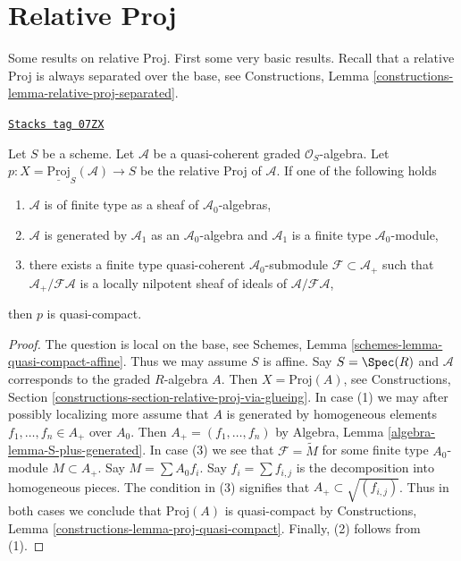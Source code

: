 \section{Relative Proj}
\label{divisors-section-relative-proj}
Some results on relative Proj.
First some very basic results. Recall that a relative Proj is always
separated over the base, see
Constructions, Lemma \ref{constructions-lemma-relative-proj-separated}.

\begin{lemma}
\label{divisors-lemma-relative-proj-quasi-compact}
\href{https://stacks.math.columbia.edu/tag/07ZX}{\texttt{Stacks tag 07ZX}}

Let $S$ be a scheme. Let $\mathcal{A}$ be a quasi-coherent graded
$\mathcal{O}_S$-algebra. Let
$p : X = \underline{\text{Proj}}_S(\mathcal{A}) \to S$ be the relative
Proj of $\mathcal{A}$. If one of the following holds
\begin{enumerate}
\item $\mathcal{A}$ is of finite type as a sheaf of
$\mathcal{A}_0$-algebras,
\item $\mathcal{A}$ is generated by $\mathcal{A}_1$ as an
$\mathcal{A}_0$-algebra and $\mathcal{A}_1$ is a finite type
$\mathcal{A}_0$-module,
\item there exists a finite type quasi-coherent $\mathcal{A}_0$-submodule
$\mathcal{F} \subset \mathcal{A}_{+}$ such that
$\mathcal{A}_{+}/\mathcal{F}\mathcal{A}$ is a locally nilpotent
sheaf of ideals of $\mathcal{A}/\mathcal{F}\mathcal{A}$,
\end{enumerate}
then $p$ is quasi-compact.
\end{lemma}

\begin{proof}
The question is local on the base, see
Schemes, Lemma \ref{schemes-lemma-quasi-compact-affine}.
Thus we may assume $S$ is affine.
Say $S = \Spec(R)$ and $\mathcal{A}$ corresponds to the
graded $R$-algebra $A$. Then $X = \text{Proj}(A)$, see
Constructions, Section \ref{constructions-section-relative-proj-via-glueing}.
In case (1) we may after possibly localizing more
assume that $A$ is generated by homogeneous elements
$f_1, \ldots, f_n \in A_{+}$ over $A_0$. Then
$A_{+} = (f_1, \ldots, f_n)$ by
Algebra, Lemma \ref{algebra-lemma-S-plus-generated}.
In case (3) we see that $\mathcal{F} = \widetilde{M}$
for some finite type $A_0$-module $M \subset A_{+}$. Say
$M = \sum A_0f_i$. Say $f_i = \sum f_{i, j}$ is the decomposition
into homogeneous pieces. The condition in (3) signifies that
$A_{+} \subset \sqrt{(f_{i, j})}$. Thus in both cases we conclude that
$\text{Proj}(A)$ is quasi-compact by
Constructions, Lemma \ref{constructions-lemma-proj-quasi-compact}.
Finally, (2) follows from (1).
\end{proof}

